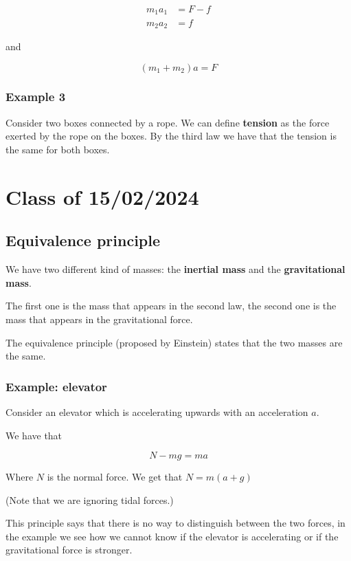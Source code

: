 \documentclass[10pt]{extarticle}
\begin{document}
\begin{align*}
    m_1 a_1 & = F - f \\
    m_2 a_2 & = f
\end{align*}

and

$$
    (m_1 + m_2) a = F
$$

\subsubsection{Example 3}

Consider two boxes connected by a rope.
We can define \textbf{tension} as the force exerted by the rope on the boxes.
By the third law we have that the tension is the same for both boxes.

\section{Class of 15/02/2024}

\subsection{Equivalence principle}

We have two different kind of masses: the \textbf{inertial mass} and the \textbf{gravitational mass}.

The first one is the mass that appears in the second law, the second one is the mass that appears in the gravitational force.

The equivalence principle (proposed by Einstein) states that the two masses are the same.

\subsubsection{Example: elevator}

Consider an elevator which is accelerating upwards with an acceleration $a$.

We have that

$$
    N - m g = m a
$$

Where $N$ is the normal force. We get that $N = m(a + g)$

(Note that we are ignoring tidal forces.)

This principle says that there is no way to distinguish between the two forces, in the example we see how we cannot know if the elevator is accelerating or if the gravitational force is stronger.
\end{document}
